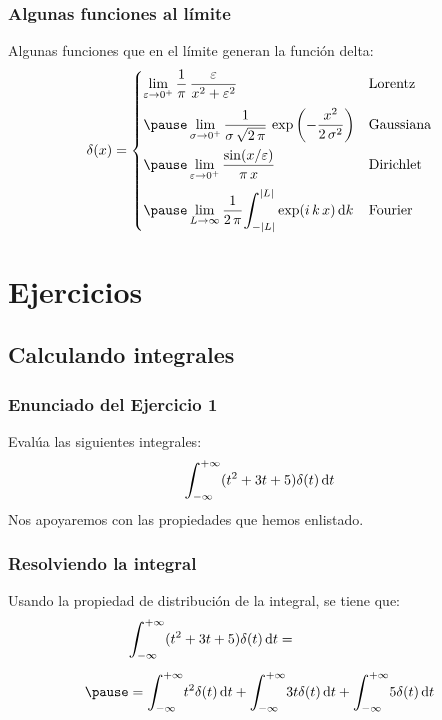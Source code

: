 \documentclass[12pt]{beamer}
\begin{document}
\begin{frame}
\frametitle{Algunas funciones al límite}
Algunas funciones que en el límite generan la función delta:
\pause
\begin{eqnarray*}
\begin{aligned}
\delta(x) = \begin{cases}
\displaystyle
\lim_{\varepsilon \to 0^{+}} \dfrac{1}{\pi} \, \dfrac{\varepsilon}{x^{2} + \varepsilon^{2}} & \mbox{Lorentz} \\[1em] \pause 
\displaystyle
\lim_{\sigma \to 0^{+}} \dfrac{1}{\sigma \, \sqrt{2 \, \pi}} \, \exp \left( - \dfrac{x^{2}}{2 \, \sigma^{2}} \right) & \mbox{Gaussiana} \\[1em] \pause
\displaystyle \lim_{\varepsilon \to 0^{+}} \dfrac{\sin(x / \varepsilon)}{ \pi \, x} & \mbox{Dirichlet} \\[1em] \pause
\displaystyle \lim_{L \to \infty} \dfrac{1}{2 \, \pi} \scaleint{6ex}_{\bs - \abs{L}}^{\abs{L}} \exp(i \, k \, x) \dd{k} & \mbox{Fourier}
\end{cases}
\end{aligned}
\end{eqnarray*}
\end{frame}

\section{Ejercicios}
\subsection{Calculando integrales}

\begin{frame}
\frametitle{Enunciado del Ejercicio 1}
Evalúa las siguientes integrales:
\pause
\begin{align*}
\scaleint{6ex}_{\bs -\infty}^{+\infty} (t^{2} + 3 t + 5) \delta (t) \dd{t}
\end{align*}
\pause
Nos apoyaremos con las propiedades que hemos enlistado.
\end{frame}

\begin{frame}
\frametitle{Resolviendo la integral}
Usando la propiedad de distribución de la integral, se tiene que:
\pause
\begin{eqnarray*}
\begin{aligned}
&\scaleint{6ex}_{\bs -\infty}^{+\infty} (t^{2} + 3 t + 5) \delta (t) \dd{t} = \\[0.5em] \pause
&= \scaleint{6ex}_{\bs -\infty}^{+\infty} t^{2} \delta (t) \dd{t} + \scaleint{6ex}_{\bs -\infty}^{+\infty} 3 t \delta (t) \dd{t} + \scaleint{6ex}_{\bs -\infty}^{+\infty} 5 \delta (t) \dd{t}
\end{aligned}
\end{eqnarray*}
\end{frame}
\end{document}
